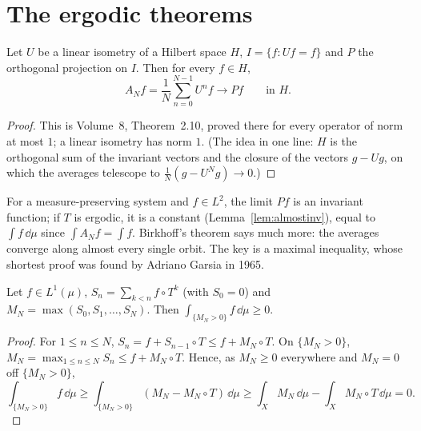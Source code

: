 \section{The ergodic theorems}

\begin{theorem}\label{thm:vonneumann}
Let $U$ be a linear isometry of a Hilbert space $H$, $I=\{f:Uf=f\}$ and $P$ the orthogonal projection on $I$. Then for every $f\in H$,
\[
A_Nf=\frac1N\sum_{n=0}^{N-1}U^nf\longrightarrow Pf\qquad\text{in }H.
\]
\end{theorem}
\begin{proof}
This is Volume~8, Theorem~2.10, proved there for every operator of norm at most $1$; a linear isometry has norm $1$. (The idea in one line: $H$ is the
orthogonal sum of the invariant vectors and the closure of the vectors $g-Ug$, on which the averages telescope to $\frac1N(g-U^Ng)\to0$.)
\end{proof}

For a measure-preserving system and $f\in L^2$, the limit $Pf$ is an invariant function; if $T$ is ergodic, it is a constant (Lemma~\ref{lem:almostinv}), equal to $\int f\,\dd\mu$ since $\int A_Nf=\int f$.
Birkhoff's theorem says much more: the averages converge along almost every single orbit. The key is a maximal inequality, whose shortest proof was found by Adriano Garsia in 1965.

\begin{lemma}\label{lem:maxergodic}
Let $f\in L^1(\mu)$, $S_n=\sum_{k<n}f\circ T^k$ (with $S_0=0$) and $M_N=\max(S_0,S_1,\dots,S_N)$. Then $\int_{\{M_N>0\}}f\,\dd\mu\ge0$.
\end{lemma}
\begin{proof}
For $1\le n\le N$, $S_n=f+S_{n-1}\circ T\le f+M_N\circ T$. On $\{M_N>0\}$, $M_N=\max_{1\le n\le N}S_n\le f+M_N\circ T$. Hence, as $M_N\ge0$ everywhere and $M_N=0$ off $\{M_N>0\}$,
\[
\int_{\{M_N>0\}}f\,\dd\mu\ge\int_{\{M_N>0\}}(M_N-M_N\circ T)\,\dd\mu\ge\int_XM_N\,\dd\mu-\int_XM_N\circ T\,\dd\mu=0.
\]
\end{proof}

